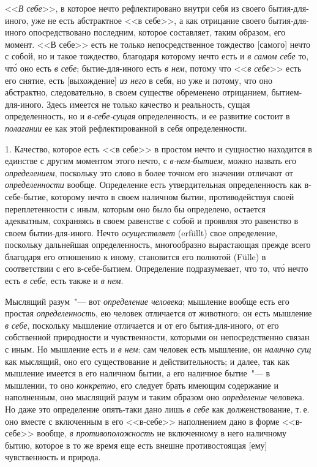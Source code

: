 <<\emph{В себе}>>, в которое нечто рефлектировано внутри себя
из своего бытия-для-иного, уже не есть абстрактное
<<в себе>>, а как отрицание своего бытия-для-иного опосредствовано
последним, которое составляет, таким образом,
его момент. <<В себе>> есть не только непосредственное
тождество [самого] нечто с собой, но и такое тождество,
благодаря которому нечто есть и \emph{в самом себе} то,
чт\'о оно есть \emph{в себе}; бытие-для-иного есть \emph{в нем}, потому
что <<\emph{в себе}>> есть его снятие, есть [выхождение] \emph{из него}
в себя, но уже и потому, что оно абстрактно, следовательно,
в своем существе обременено отрицанием, бытием-для-иного.
Здесь имеется не только качество и реальность,
сущая определенность, но и \emph{в-себе-сущая} определенность,
и ее развитие состоит в \emph{полагании} ее как этой
рефлектированной в себя определенности.

1. Качество, которое есть <<в себе>> в простом нечто
и сущностно находится в единстве с другим моментом
этого нечто, с \emph{в-нем-бытием}, можно назвать его \emph{определением},
поскольку это слово в более точном его значении
отличают от \emph{определенности} вообще. Определение есть
утвердительная определенность как в-себе-бытие, которому
нечто в своем наличном бытии, противодействуя своей
переплетенности с иным, которым оно было бы определено,
остается адекватным, сохраняясь в своем равенстве
с собой и проявляя это равенство в своем бытии-для-иного.
Нечто \emph{осуществляет} (erfüllt) свое определение\endnotemark{}, поскольку
дальнейшая определенность, многообразно вырастающая
прежде всего благодаря его отношению к иному,
становится его полнотой (Fülle) в соответствии с его
в-себе-бытием. Определение подразумевает, что то, чт\'о
нечто есть \emph{в себе}, есть также и \emph{в нем}.


Мыслящий разум~"--- вот \emph{определение человека}; мышление
вообще есть его простая \emph{определенность}, ею человек
отличается от животного; он есть мышление \emph{в себе},
поскольку мышление отличается и от его бытия-для-иного,
от его собственной природности и чувственности,
которыми он непосредственно связан с иным. Но мышление
есть и \emph{в нем}: сам человек есть мышление, он \emph{налично
сущ} как мыслящий, оно его существование и действительность;
и далее, так как мышление имеется в его наличном
бытии, а его наличное бытие~"--- в мышлении, то
оно \emph{конкретно}, его следует брать имеющим содержание
и наполненным, оно мыслящий разум и таким образом
оно \emph{определение} человека. Но даже это определение
опять-таки дано лишь \emph{в себе} как долженствование, т.\,е.
оно вместе с включенным в его <<в-себе>> наполнением
дано в форме <<в-себе>> вообще, \emph{в противоположность} не
включенному в него наличному бытию, которое в то же
время еще есть внешне противостоящая [ему] чувственность
и природа.

